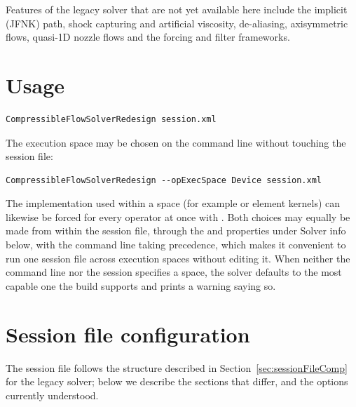 Features of the legacy solver that are not yet available here include the
implicit (JFNK) path, shock capturing and artificial viscosity, de-aliasing,
axisymmetric flows, quasi-1D nozzle flows and the forcing and filter
frameworks.

\section{Usage}
\begin{lstlisting}[style=BashInputStyle]
CompressibleFlowSolverRedesign session.xml
\end{lstlisting}

The execution space may be chosen on the command line without touching the
session file:

\begin{lstlisting}[style=BashInputStyle]
CompressibleFlowSolverRedesign --opExecSpace Device session.xml
\end{lstlisting}

The implementation used within a space (for example  or
 element kernels) can likewise be forced for every operator
at once with . Both choices may equally be made from
within the session file, through the  and
 properties under Solver info below, with
the command line taking precedence, which makes it convenient to run one
session file across execution spaces without editing it. When neither the
command line nor the session specifies a space, the solver defaults to
the most capable one the build supports and prints a warning saying so.

\section{Session file configuration}
\label{sec:sessionFileCompRedesign}
The session file follows the structure described in
Section~\ref{sec:sessionFileComp} for the legacy solver; below we describe
the sections that differ, and the options currently understood.

